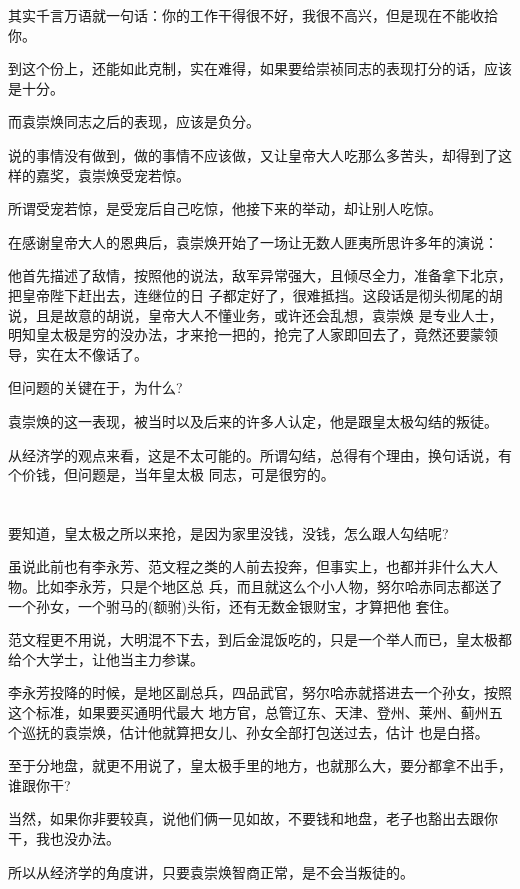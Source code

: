 \documentclass[11pt,a4paper,onecolumn]{article}
\begin{document}
其实千言万语就一句话：你的工作干得很不好，我很不高兴，但是现在不能收拾你。

到这个份上，还能如此克制，实在难得，如果要给崇祯同志的表现打分的话，应该是十分。

而袁崇焕同志之后的表现，应该是负分。

说的事情没有做到，做的事情不应该做，又让皇帝大人吃那么多苦头，却得到了这样的嘉奖，袁崇焕受宠若惊。

所谓受宠若惊，是受宠后自己吃惊，他接下来的举动，却让别人吃惊。

在感谢皇帝大人的恩典后，袁崇焕开始了一场让无数人匪夷所思许多年的演说：

他首先描述了敌情，按照他的说法，敌军异常强大，且倾尽全力，准备拿下北京，把皇帝陛下赶出去，连继位的日
子都定好了，很难抵挡。这段话是彻头彻尾的胡说，且是故意的胡说，皇帝大人不懂业务，或许还会乱想，袁崇焕
是专业人士，明知皇太极是穷的没办法，才来抢一把的，抢完了人家即回去了，竟然还要蒙领导，实在太不像话了。

但问题的关键在于，为什么?

袁崇焕的这一表现，被当时以及后来的许多人认定，他是跟皇太极勾结的叛徒。

从经济学的观点来看，这是不太可能的。所谓勾结，总得有个理由，换句话说，有个价钱，但问题是，当年皇太极
同志，可是很穷的。

\section[\thesection]{}

要知道，皇太极之所以来抢，是因为家里没钱，没钱，怎么跟人勾结呢?

虽说此前也有李永芳、范文程之类的人前去投奔，但事实上，也都并非什么大人物。比如李永芳，只是个地区总
兵，而且就这么个小人物，努尔哈赤同志都送了一个孙女，一个驸马的(额驸)头衔，还有无数金银财宝，才算把他
套住。

范文程更不用说，大明混不下去，到后金混饭吃的，只是一个举人而已，皇太极都给个大学士，让他当主力参谋。

李永芳投降的时候，是地区副总兵，四品武官，努尔哈赤就搭进去一个孙女，按照这个标准，如果要买通明代最大
地方官，总管辽东、天津、登州、莱州、蓟州五个巡抚的袁崇焕，估计他就算把女儿、孙女全部打包送过去，估计
也是白搭。

至于分地盘，就更不用说了，皇太极手里的地方，也就那么大，要分都拿不出手，谁跟你干?

当然，如果你非要较真，说他们俩一见如故，不要钱和地盘，老子也豁出去跟你干，我也没办法。

所以从经济学的角度讲，只要袁崇焕智商正常，是不会当叛徒的。
\end{document}
